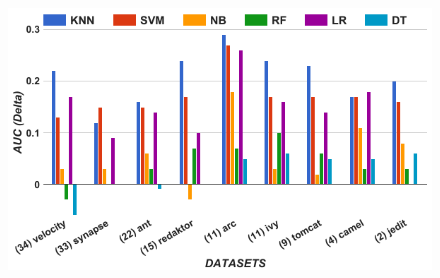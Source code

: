 
\begin{figure}[!t]
\begin{minipage}{.5\linewidth}
\centering
        \includegraphics[width=\linewidth]{./fig/AUC_untuned.png}
        

\end{minipage}
\end{figure}
